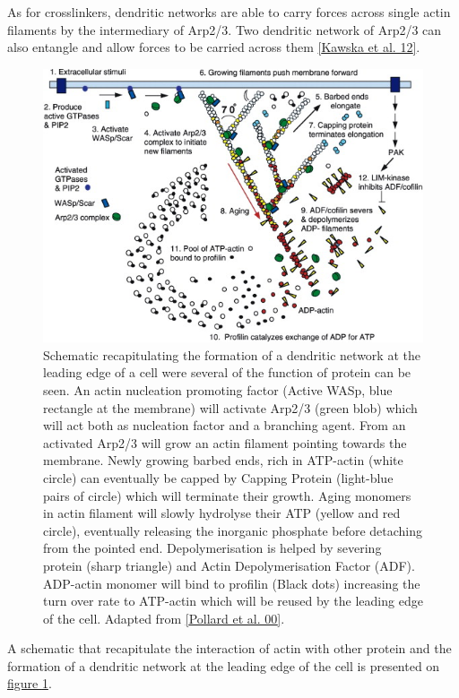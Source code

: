 \documentclass[A4paperpaper,11pt,english]{sphinxmanual}
\begin{document}
As for crosslinkers, dendritic networks are able to carry forces across single
actin filaments by the intermediary of Arp2/3. Two dendritic network of Arp2/3
can also entangle and allow forces to be carried across them
{\hyperref[parts/part1:kawska2012]{{[}Kawska et al. 12{]}}}.
\begin{figure}[htbp]
\centering
\capstart

\includegraphics[width=0.700\linewidth]{pollard2003-actin-cycle.jpg}
\caption{Schematic recapitulating the formation of
a dendritic network at the leading edge of a cell were several of the
function of protein can be seen. An actin nucleation promoting factor
(Active WASp,  blue rectangle at the membrane) will activate Arp2/3 (green
blob) which will act both as nucleation factor and a branching agent. From
an activated Arp2/3 will grow an actin filament pointing towards the
membrane. Newly growing barbed ends, rich in ATP-actin (white circle) can
eventually be capped by Capping Protein (light-blue pairs of circle) which
will terminate their growth.  Aging monomers in actin filament will slowly
hydrolyse their ATP (yellow and red circle), eventually releasing the
inorganic phosphate before detaching from the pointed end.
Depolymerisation is helped by severing protein (sharp triangle) and Actin
Depolymerisation Factor (ADF). ADP-actin monomer will bind to profilin
(Black dots) increasing the turn over rate to ATP-actin which will be reused
by the leading edge of the cell. Adapted from {\hyperref[parts/part1:pollard2000]{{[}Pollard et al. 00{]}}}.}\label{parts/part1:actin-cycle}\end{figure}

A schematic that recapitulate the interaction of actin with other protein and
the formation of a dendritic network at the leading edge of the cell is
presented on \hyperref[parts/part1:actin-cycle]{figure  \ref*{parts/part1:actin-cycle}}.
\end{document}
